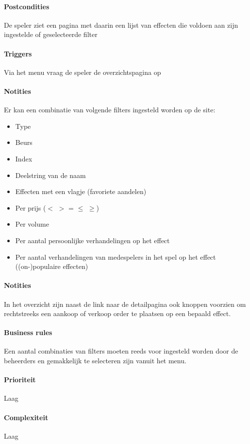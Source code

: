 \paragraph{Postcondities} De speler ziet een pagina met daarin een lijst van effecten die voldoen aan zijn ingestelde of geselecteerde filter
\paragraph{Triggers} Via het menu vraag de speler de overzichtspagina op\paragraph{Notities} Er kan een combinatie van volgende filters ingesteld worden op de site:

\begin{itemize}
	\item Type
	\item Beurs
	\item Index
	\item Deelstring van de naam
	\item Effecten met een vlagje (favoriete aandelen)
	\item Per prijs ($<$ $>$ = $\leq$ $\geq$)
	\item Per volume
	\item Per aantal persoonlijke verhandelingen op het effect
	\item Per aantal verhandelingen van medespelers in het spel op het effect ((on-)populaire effecten)
\end{itemize}

\paragraph{Notities}In het overzicht zijn naast de link naar de detailpagina ook knoppen voorzien om rechtstreeks een aankoop of verkoop order te plaatsen op een bepaald effect.
\paragraph{Business rules}Een aantal combinaties van filters moeten reeds voor ingesteld worden door de beheerders en gemakkelijk te selecteren zijn vanuit het menu.
\paragraph{Prioriteit}Laag
\paragraph{Complexiteit}Laag
